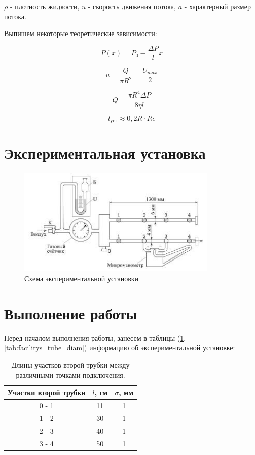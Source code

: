 \documentclass[12pt,a4paper]{article}
\begin{document}
$\rho$ - плотность жидкости, $u$ - скорость движения потока, $a$ - характерный размер потока.

Выпишем некоторые теоретические зависимости:

$$P(x) = P_{0} - \frac{\Delta P}{l}x$$

$$u = \frac{Q}{\pi R^{2}} = \frac{U_{max}}{2}$$

$$Q = \frac{\pi R^{4} \Delta P}{8\eta l}$$

$$l_{\text{уст}} \approx 0,2R\cdot Re$$
\newpage

\section{Экспериментальная установка}

\begin{figure}[h!]
	\begin{center}
		\includegraphics[width = 0.85\textwidth]{Scem_of_facility}
		\caption{Схема экспериментальной установки}
		\label{fig:facility}
	\end{center}
\end{figure}

\section{Выполнение работы}

Перед началом выполнения работы, занесем в таблицы (\ref{tab:second_tube_parametrs},\ref{tab:facilitys_tube_diam})  информацию об экспериментальной установке:

\begin{table}[h!]
\centering
\begin{tabular}{|c|c|c|}
\hline
Участки второй трубки & $l$, см & $\sigma$, мм \\ \hline
0 - 1                 & 11      & 1            \\ \hline
1 - 2                 & 30      & 1            \\ \hline
2 - 3                 & 40      & 1            \\ \hline
3 - 4                 & 50      & 1            \\ \hline
\end{tabular}
\caption{Длины участков второй трубки между различными точками подключения.}
\label{tab:second_tube_parametrs}
\end{table}
\end{document}
